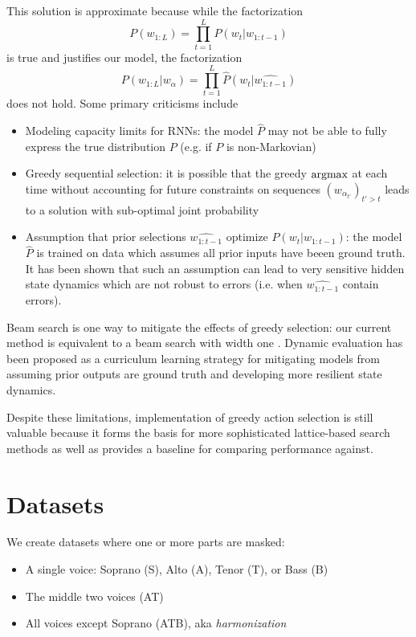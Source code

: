 This solution is approximate because while the factorization
\begin{equation}
  P(w_{1:L}) = \prod_{t=1}^L P(w_t | w_{1:t-1})
\end{equation}
is true and justifies our model, the factorization
\begin{equation}
  P(w_{1:L} | w_{\alpha}) = \prod_{t=1}^L \hat{P}(w_t | \hat{w_{1:t-1}} )
\end{equation}
does not hold. Some primary criticisms include
\begin{itemize}
  \item Modeling capacity limits for RNNs: the model $\hat{P}$ may not be able to fully express
    the true distribution $P$ (e.g. if $P$ is non-Markovian)
  \item Greedy sequential selection: it is possible that the greedy $\operatorname*{argmax}$ at each
    time without accounting for future constraints on sequences $(w_{\alpha_{t'}})_{t' > t}$
    leads to a solution with sub-optimal joint probability
  \item Assumption that prior selections $\hat{w_{1:t-1}}$ optimize $P(w_t | w_{1:t-1})$:
    the model $\hat{P}$ is trained on data which assumes all prior inputs have beeen
    ground truth. It has been shown  that such an assumption can lead to
    very sensitive hidden state dynamics which are not robust to errors (i.e. when
    $\hat{w_{1:t-1}}$ contain errors).
\end{itemize}
Beam search is one way to mitigate the effects of greedy selection: our current method
is equivalent to a beam search with width one .
Dynamic evaluation  has been proposed as a curriculum learning strategy for
mitigating models from assuming prior outputs are ground truth and developing more resilient
state dynamics.

Despite these limitations, implementation of greedy action selection is still valuable
because it forms the basis for more sophisticated lattice-based search methods as well as
provides a baseline for comparing performance against.

\section{Datasets}

We create datasets where one or more parts are masked:
\begin{itemize}
  \item A single voice: Soprano (S), Alto (A), Tenor (T), or Bass (B)
  \item The middle two voices (AT)
  \item All voices except Soprano (ATB), aka \emph{harmonization}
\end{itemize}

